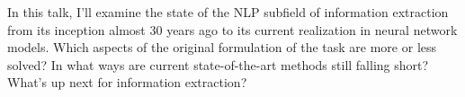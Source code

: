 In this talk, I’ll examine the state of the NLP subfield of information extraction from its
inception almost 30 years ago to its current realization in neural network models. Which aspects of
the original formulation of the task are more or less solved? In what ways are current state-of-the-art
methods still falling short? What’s up next for information extraction?
